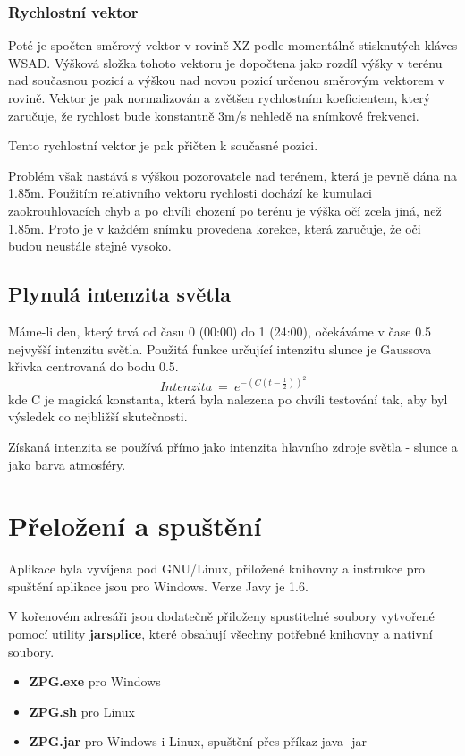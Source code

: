 \documentclass[11pt]{article}
\begin{document}
\subsubsection{Rychlostní vektor}
Poté je spočten směrový vektor v rovině XZ podle momentálně stisknutých
kláves WSAD. Výšková složka tohoto vektoru je dopočtena jako rozdíl výšky v
terénu nad současnou pozicí a výškou nad novou pozicí určenou směrovým vektorem
v rovině. Vektor je pak normalizován a zvětšen rychlostním koeficientem, který
zaručuje, že rychlost bude konstantně 3m/s nehledě na snímkové frekvenci.

Tento rychlostní vektor je pak přičten k současné pozici.

Problém však nastává s výškou pozorovatele nad terénem, která je pevně dána na
1.85m. Použitím relativního vektoru rychlosti dochází ke kumulaci
zaokrouhlovacích chyb a po chvíli chození po terénu je výška očí zcela jiná,
než 1.85m. Proto je v každém snímku provedena korekce, která zaručuje, že oči
budou neustále stejně vysoko.

\subsection{Plynulá intenzita světla}
Máme-li den, který trvá od času 0 (00:00) do 1 (24:00), očekáváme v čase 0.5
nejvyšší intenzitu světla. Použitá funkce určující intenzitu slunce je Gaussova
křivka centrovaná do bodu 0.5.
$$
Intenzita~=~e^{- (C(t - \frac{1}{2}))^2}
$$
kde C je magická konstanta, která byla nalezena po chvíli testování tak, aby
byl výsledek co nejbližší skutečnosti.

Získaná intenzita se používá přímo jako intenzita hlavního zdroje světla - slunce a jako barva atmosféry.

\clearpage
\section{Přeložení a spuštění}
Aplikace byla vyvíjena pod GNU/Linux, přiložené knihovny a instrukce pro
spuštění aplikace jsou pro Windows. Verze Javy je 1.6.

V kořenovém adresáři jsou dodatečně přiloženy spustitelné soubory vytvořené
pomocí utility \textbf{jarsplice}, které obsahují všechny potřebné knihovny a
nativní soubory.
\begin{itemize}
	\item \textbf{ZPG.exe} pro Windows
	\item \textbf{ZPG.sh} pro Linux
	\item \textbf{ZPG.jar} pro Windows i Linux, spuštění přes příkaz java -jar
\end{itemize}
\end{document}
